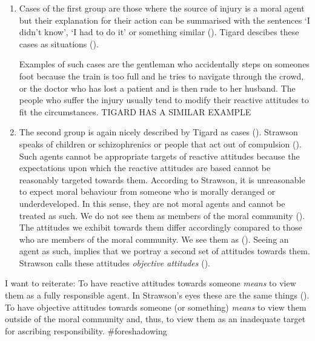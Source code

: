 \documentclass{article}
\begin{document}
\begin{enumerate}
	\item Cases of the first group are those where the source of injury is a
		moral agent but their explanation for their action can be
		summarised with the sentences `I didn't know', `I had to do it'
		or something similar (\cite[p.7-8]{Strawson1962}). Tigard
		descibes these cases as situations  
		(\cite[p.5]{Tigard_2020}).

		Examples of such cases are the gentleman who accidentally steps
		on someones foot because the train is too full and he tries to
		navigate through the crowd, or the doctor who has lost a patient
		and is then rude to her husband. The people who suffer the
		injury usually tend to modify their reactive attitudes to fit
		the circumstances.
		TIGARD HAS A SIMILAR EXAMPLE



	\item The second group is again nicely described by Tigard as cases
		 (\cite[p.5]{Tigard_2020}). Strawson speaks of children
		or schizophrenics or people that act out of compulsion
		(\cite[p.8-9]{Strawson1962}). Such
		agents cannot be appropriate targets of reactive attitudes
		because the expectations upon which the reactive attitudes are
		based cannot be reasonably targeted towards them. According to
		Strawson, it is unreasonable to expect moral behaviour from
		someone who is morally deranged or underdeveloped. In this
		sense, they are not moral agents and cannot be treated as such.
		We do not see them as members of the moral community
		(\cite[p.18]{Strawson1962}). The attitudes we exhibit towards
		them differ accordingly compared to those who are members of the
		moral community. We see them as 
		(\cite[p.8]{Strawson1962}). Seeing an agent as such, implies
		that we portray a second set of attitudes towards them. Strawson
		calls these attitudes \textit{objective attitudes}
		(\cite[p.9]{Strawson1962}). 
\end{enumerate}

I want to reiterate: To have reactive attitudes towards someone \textit{means}
to view them as a fully responsible agent. In Strawson's eyes these are the same
things (\cite[p.23]{Strawson1962}). To have objective attitudes towards someone (or something)
\textit{means} to view them outside of the moral community and, thus, to view
them as an inadequate target for ascribing responsibility. \#foreshadowing\\
\end{document}
